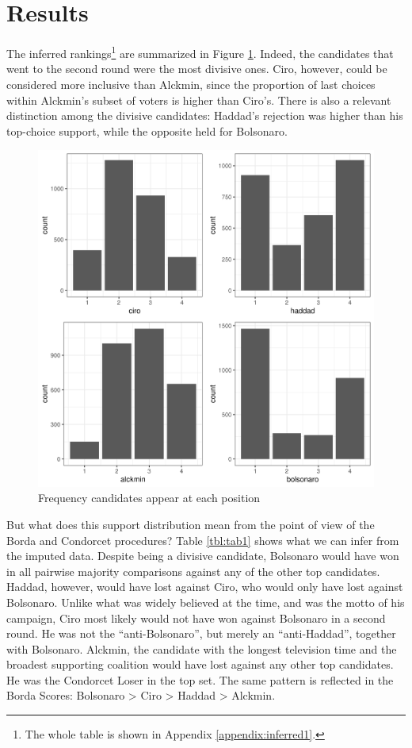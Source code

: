 \documentclass[hidelinks,11pt]{article}
\begin{document}
\section{Results}
The inferred rankings\footnote{The whole table is shown in Appendix
  \ref{appendix:inferred1}.} are summarized in Figure \ref{fig:counts}. Indeed,
the candidates that went to the second round were the most divisive ones. Ciro,
however, could be considered more inclusive than Alckmin, since the proportion
of last choices within Alckmin's subset of voters is higher than Ciro's. There
is also a relevant distinction among the divisive candidates: Haddad's rejection
was higher than his top-choice support, while the opposite held for Bolsonaro.

\begin{figure}[H]
 \centering
 \includegraphics[width=0.8\columnwidth,
 height=0.5\textheight]{./images/corrected1_indexes_plot.png}
 \caption{Frequency candidates appear at each position}
 \label{fig:counts}
\end{figure}

But what does this support distribution mean from the point of view of the Borda and Condorcet procedures? Table \ref{tbl:tab1} shows what we can infer from the imputed data. Despite being a divisive candidate, Bolsonaro would have won in all pairwise majority comparisons against any of the other top candidates. Haddad, however, would have lost against Ciro, who would only have lost against Bolsonaro. Unlike what was widely believed at the time, and was the motto of  his campaign, Ciro most likely would not have won against Bolsonaro in a second round. He was not the ``anti-Bolsonaro'', but merely an ``anti-Haddad'', together with Bolsonaro. Alckmin, the candidate with the longest television time and the broadest supporting coalition would have lost against any other top candidates. He was the Condorcet Loser in the top set. The same pattern is reflected in the Borda Scores: Bolsonaro > Ciro > Haddad > Alckmin.
\end{document}
